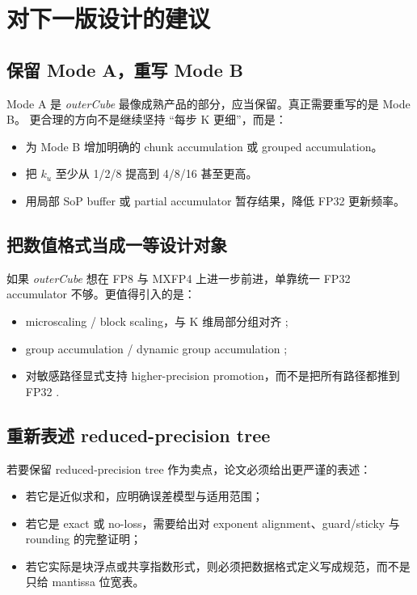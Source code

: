 \documentclass[UTF8,11pt,a4paper]{ctexart}
\newcommand{\ku}{\ensuremath{k_u}}
\newcommand{\modea}{Mode A}
\newcommand{\modeb}{Mode B}
\newcommand{\outercube}{\textit{outerCube}}
\begin{document}
\section{对下一版设计的建议}

\subsection{保留 \modea{}，重写 \modeb{}}

\modea{} 是 \outercube{} 最像成熟产品的部分，应当保留。真正需要重写的是 \modeb{}。
更合理的方向不是继续坚持 ``每步 K 更细''，而是：

\begin{itemize}
  \item 为 \modeb{} 增加明确的 chunk accumulation 或 grouped accumulation。
  \item 把 $\ku$ 至少从 1/2/8 提高到 4/8/16 甚至更高。
  \item 用局部 SoP buffer 或 partial accumulator 暂存结果，降低 FP32 更新频率。
\end{itemize}

\subsection{把数值格式当成一等设计对象}

如果 \outercube{} 想在 FP8 与 MXFP4 上进一步前进，单靠统一 FP32 accumulator 不够。更值得引入的是：

\begin{itemize}
  \item microscaling / block scaling，与 K 维局部分组对齐 \cite{mx};
  \item group accumulation / dynamic group accumulation \cite{dga};
  \item 对敏感路径显式支持 higher-precision promotion，而不是把所有路径都推到 FP32 \cite{deepseekv3}.
\end{itemize}

\subsection{重新表述 reduced-precision tree}

若要保留 reduced-precision tree 作为卖点，论文必须给出更严谨的表述：

\begin{itemize}
  \item 若它是近似求和，应明确误差模型与适用范围；
  \item 若它是 exact 或 no-loss，需要给出对 exponent alignment、guard/sticky 与 rounding 的完整证明；
  \item 若它实际是块浮点或共享指数形式，则必须把数据格式定义写成规范，而不是只给 mantissa 位宽表。
\end{itemize}
\end{document}

